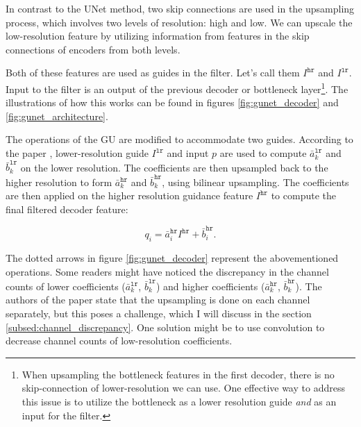 In contrast to the UNet method, two skip connections are used in the upsampling process, which involves two levels of resolution: high and low. We can upscale the low-resolution feature by utilizing information from features in the skip connections of encoders from both levels.

Both of these features are used as guides in the filter. Let's call them $I^{\texttt{hr}}$ and $I^{\texttt{lr}}$. Input to the filter is an output of the previous decoder or bottleneck layer\footnote{When upsampling the bottleneck features in the first decoder, there is no skip-connection of lower-resolution we can use. One effective way to address this issue is to utilize the bottleneck as a lower resolution guide \textit{and} as an input for the filter.}. The illustrations of how this works can be found in figures \ref{fig:gunet_decoder} and \ref{fig:gunet_architecture}.

The operations of the \gls{GU} are modified to accommodate two guides. According to the paper \cite{gunet}, lower-resolution guide $I^{\texttt{lr}}$ and input $p$ are used to compute $\bar a_k^{\texttt{lr}}$ and $\bar b_k^{\texttt{lr}}$ on the lower resolution. The coefficients are then upsampled back to the higher resolution to form $\bar a_k^{\texttt{hr}}$ and $\bar b_k^{\texttt{hr}}$, using bilinear upsampling. The coefficients are then applied on the higher resolution guidance feature $I^{\texttt{hr}}$ to compute the final filtered decoder feature:

\begin{equation}\label{eq:guided_upsampling}
    q_i = \bar a_i^{\texttt{hr}}I^{\texttt{hr}} +\bar b_i^{\texttt{hr}}.
\end{equation}

The dotted arrows in figure \ref{fig:gunet_decoder} represent the abovementioned operations. Some readers might have noticed the discrepancy in the channel counts of lower coefficients ($\bar a_k^{\texttt{lr}}$, $\bar b_k^{\texttt{lr}}$) and higher coefficients ($\bar a_k^{\texttt{hr}}$, $\bar b_k^{\texttt{hr}}$). The authors of the paper state that the upsampling is done on each channel separately, but this poses a challenge, which I will discuss in the section \ref{subsed:channel_discrepancy}. One solution might be to use convolution to decrease channel counts of low-resolution coefficients.

